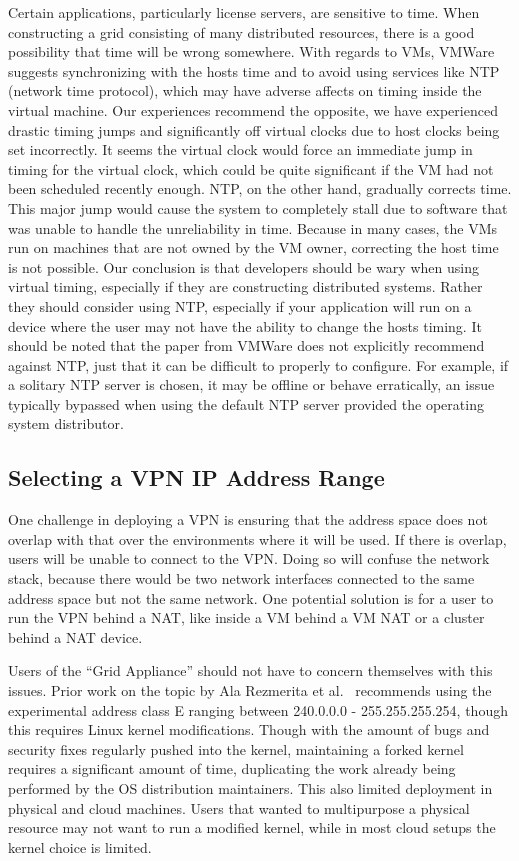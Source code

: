 \documentclass[conference]{IEEEtran}
\begin{document}
Certain applications, particularly license servers, are sensitive to time.
When constructing a grid consisting of many distributed resources, there is a
good possibility that time will be wrong somewhere.  With regards to VMs,
VMWare~\cite{vmware_timing} suggests synchronizing with the hosts time and to
avoid using services like NTP (network time protocol), which may have adverse
affects on timing inside the virtual machine.  Our experiences recommend the
opposite, we have experienced drastic timing jumps and significantly off
virtual clocks due to host clocks being set incorrectly.  It seems the virtual
clock would force an immediate jump in timing for the virtual clock, which
could be quite significant if the VM had not been scheduled recently enough.
NTP, on the other hand, gradually corrects time.  This major jump would cause
the system to completely stall due to software that was unable to handle the
unreliability in time.  Because in many cases, the VMs run on machines that are
not owned by the VM owner, correcting the host time is not possible.  Our
conclusion is that developers should be wary when using virtual timing,
especially if they are constructing distributed systems.  Rather they should
consider using NTP, especially if your application will run on a device where
the user may not have the ability to change the hosts timing.  It should be
noted that the paper from VMWare does not explicitly recommend against NTP,
just that it can be difficult to properly to configure.  For example, if a
solitary NTP server is chosen, it may be offline or behave erratically, an
issue typically bypassed when using the default NTP server provided the
operating system distributor.

\subsection{Selecting a VPN IP Address Range}

One challenge in deploying a VPN is ensuring that the address space does not
overlap with that over the environments where it will be used.  If there is
overlap, users will be unable to connect to the VPN.  Doing so will confuse the
network stack, because there would be two network interfaces connected to the
same address space but not the same network.  One potential solution is for a
user to run the VPN behind a NAT, like inside a VM behind a VM NAT or a cluster
behind a NAT device.

Users of the ``Grid Appliance'' should not have to concern themselves with this
issues.  Prior work on the topic by Ala Rezmerita et al.~\cite{pvc} recommends
using the experimental address class E ranging between 240.0.0.0 -
255.255.255.254, though this requires Linux kernel modifications.  Though with
the amount of bugs and security fixes regularly pushed into the kernel,
maintaining a forked kernel requires a significant amount of time, duplicating
the work already being performed by the OS distribution maintainers.  This also
limited deployment in physical and cloud machines.  Users that wanted to
multipurpose a physical resource may not want to run a modified kernel, while
in most cloud setups the kernel choice is limited.
\end{document}
